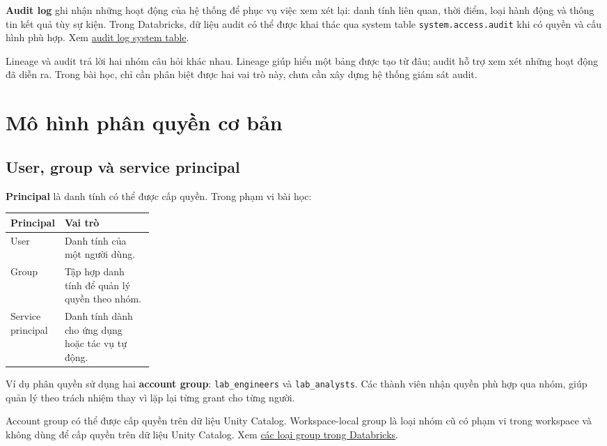 \textbf{Audit log} ghi nhận những hoạt động của hệ thống để phục vụ việc xem xét lại: danh tính liên quan, thời điểm, loại hành động và thông tin kết quả tùy sự kiện. Trong Databricks, dữ liệu audit có thể được khai thác qua system table \texttt{system.\allowbreak{}access.\allowbreak{}audit} khi có quyền và cấu hình phù hợp. Xem \href{https://docs.databricks.com/aws/en/admin/system-tables/audit-logs}{audit log system table}.


Lineage và audit trả lời hai nhóm câu hỏi khác nhau. Lineage giúp hiểu một bảng được tạo từ đâu; audit hỗ trợ xem xét những hoạt động đã diễn ra. Trong bài học, chỉ cần phân biệt được hai vai trò này, chưa cần xây dựng hệ thống giám sát audit.


\FloatBarrier
{}
\section{Mô hình phân quyền cơ bản}

\FloatBarrier
{}
\subsection{User, group và service principal}

\textbf{Principal} là danh tính có thể được cấp quyền. Trong phạm vi bài học:


\begin{table}[H]
\small
\renewcommand{\arraystretch}{1.25}
\begin{tabularx}{\linewidth}{@{}p{0.24\linewidth}Y@{}}
\toprule
{}
\textbf{Principal} & \textbf{Vai trò} \\
\midrule
User & Danh tính của một người dùng. \\
Group & Tập hợp danh tính để quản lý quyền theo nhóm. \\
Service principal & Danh tính dành cho ứng dụng hoặc tác vụ tự động. \\
\bottomrule
\end{tabularx}
\end{table}


Ví dụ phân quyền sử dụng hai \textbf{account group}: \texttt{lab\_\allowbreak{}engineers} và \texttt{lab\_\allowbreak{}analysts}. Các thành viên nhận quyền phù hợp qua nhóm, giúp quản lý theo trách nhiệm thay vì lặp lại từng grant cho từng người.


Account group có thể được cấp quyền trên dữ liệu Unity Catalog. Workspace-local group là loại nhóm cũ có phạm vi trong workspace và không dùng để cấp quyền trên dữ liệu Unity Catalog. Xem \href{https://docs.databricks.com/aws/en/admin/users-groups/groups}{các loại group trong Databricks}.


